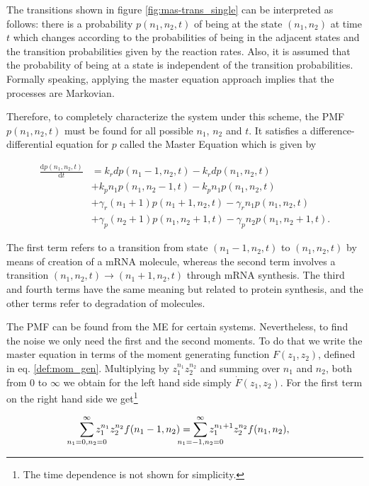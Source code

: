 The transitions shown in figure \ref{fig:mas-trans_single} can be interpreted as follows: there is a probability $p(n_1,n_2,t)$ of being at the state $(n_1,n_2)$ at time $t$ which changes according to the probabilities of being in the adjacent states and the transition probabilities given by the reaction rates. Also, it is assumed that the probability of being at a state is independent of the transition probabilities. Formally speaking, applying the master equation approach implies that the processes are Markovian.

Therefore, to completely characterize the system under this scheme, the PMF $p(n_1,n_2,t)$ must be found for all possible $n_1$, $n_2$ and $t$. It satisfies a difference-differential equation for $p$ called the Master Equation which is given by

\begin{equation}
  \label{eq:master}
  \begin{split}
    \frac{\mathrm{d}p(n_1,n_2,t)}{\mathrm{d}t} &= k_rdp(n_1-1,n_2,t) - k_rdp(n_1,n_2,t)\\
&+ k_pn_1p(n_1,n_2-1,t) - k_pn_1p(n_1,n_2,t)\\
&+ \gamma_r(n_1+1)p(n_1+1,n_2,t) - \gamma_rn_1p(n_1,n_2,t)\\
&+ \gamma_p(n_2+1)p(n_1,n_2+1,t) - \gamma_pn_2p(n_1,n_2+1,t).
  \end{split}
\end{equation}

The first term refers to a transition from state $(n_1-1,n_2,t)$ to $(n_1,n_2,t)$ by means of creation of a mRNA molecule, whereas the second term involves a transition $(n_1,n_2,t) \rightarrow (n_1+1,n_2,t)$ through mRNA synthesis. The third and fourth terms have the same meaning but related to protein synthesis, and the other terms refer to degradation of molecules.

The PMF can be found from the ME for certain systems. Nevertheless, to find the noise we only need the first and the second moments. To do that we write the master equation in terms of the moment generating function $F(z_1,z_2)$, defined in eq. \eqref{def:mom_gen}. Multiplying by $z_1^{n_1}z_2^{n_2}$ and summing over $n_1$ and $n_2$, both from $0$ to $\infty$ we obtain for the left hand side simply $\dot{F}(z_1,z_2)$. For the first term on the right hand side we get\footnote{The time dependence is not shown for simplicity.}

\begin{equation*}
  \sum_{\mathclap{n_1=0,n_2=0}}^\infty z_1^{n_1}z_2^{n_2}f(n_1-1,n_2) = \sum_{\mathclap{n_1=-1,n_2=0}}^\infty z_1^{n_1+1}z_2^{n_2}f(n_1,n_2),
\end{equation*}

